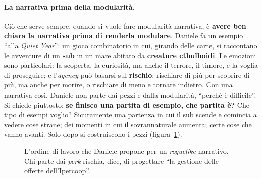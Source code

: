 \paragraph{La narrativa prima della modularità.} Ciò che serve sempre, quando si vuole
fare modularità narrativa, è \textbf{avere ben chiara la narrativa prima di renderla
modulare}. Daniele fa un esempio ``alla \emph{Quiet Year}'': un gioco combinatorio in cui,
girando delle carte, si raccontano le avventure di un \textbf{sub} in un mare abitato da
\textbf{creature cthulhoidi}. Le emozioni sono particolari: la scoperta, la curiosità, ma
anche il terrore, il timore, e la voglia di proseguire; e l'\emph{agency} può basarsi sul
\textbf{rischio}: rischiare di più per scoprire di più, ma anche per morire, o rischiare
di meno e tornare indietro. Con una narrativa così, Daniele non parte dai pezzi e dalla
modularità, ``perché è difficile''. Si chiede piuttosto: \textbf{se finisco una partita di
esempio, che partita è?} Che tipo di esempi voglio? Sicuramente una partenza in cui il sub
scende e comincia a vedere cose strane; dei momenti in cui il sovrannaturale aumenta; certe
cose che vanno avanti. Solo dopo si costruiscono i pezzi
(figura~\ref{a11:fig:modulare}).

\begin{figure}[htbp]
\centering
{}
\caption{L'ordine di lavoro che Daniele propone per un \emph{roguelike} narrativo. Chi
parte dai \emph{perk} rischia, dice, di progettare ``la gestione delle offerte
dell'Ipercoop''.}
\label{a11:fig:modulare}
\end{figure}

